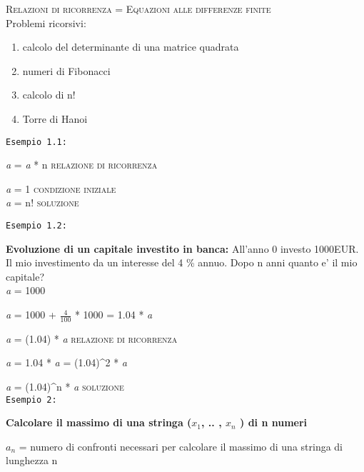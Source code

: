 \documentclass[12pt,a4paper]{article}
\begin{document}
\textsc{Relazioni di ricorrenza = Equazioni alle differenze finite}
 \\

Problemi ricorsivi:
\begin{enumerate}
\item calcolo del determinante di una matrice quadrata
\item numeri di Fibonacci
\item calcolo di n!
\item Torre di Hanoi
\end{enumerate} 

\par
\texttt{Esempio 1.1:} \par
    \textit{a} = \textit{a} * n \rightarrow \textsc{relazione di ricorrenza} \par
    \textit{a} = 1 \rightarrow \textsc{condizione iniziale} \\

    \textit{a} = n!  \rightarrow \textsc{soluzione} \\

\par
\texttt{Esempio 1.2:} \par
\textbf{Evoluzione di un capitale investito in banca:}  All'anno 0 investo 1000EUR. Il mio investimento da un interesse del 4 \% annuo. Dopo n anni quanto e' il mio capitale? \\

\textit{a} = 1000 \par
\textit{a} = 1000 + $\frac{4}{100}$ * 1000 = 1.04 * \textit{a} \par
\textit{a} = (1.04) * \textit{a} \rightarrow \textsc{relazione di ricorrenza} \par

\textit{a} = 1.04 * \textit{a} = (1.04)^2 * \textit{a} \par

\textit{a} = (1.04)^n * \textit{a} \rightarrow \textsc{soluzione} 
\\

\texttt{Esempio 2:} \par
\textbf{Calcolare il massimo di una stringa ($x_1$, .. , $x_n$ ) di n numeri} \par

$a_n$ = numero di confronti necessari per calcolare il massimo di una stringa di lunghezza n \\
\end{document}
